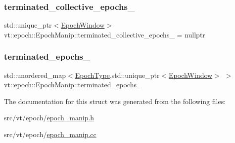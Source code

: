 \subsubsection{\texorpdfstring{terminated\+\_\+collective\+\_\+epochs\+\_\+}{terminated\_collective\_epochs\_}}
{\footnotesize\ttfamily std\+::unique\+\_\+ptr$<$\hyperlink{structvt_1_1epoch_1_1_epoch_window}{Epoch\+Window}$>$ vt\+::epoch\+::\+Epoch\+Manip\+::terminated\+\_\+collective\+\_\+epochs\+\_\+ = nullptr\hspace{0.3cm}{\ttfamily [private]}}

\mbox{\label{structvt_1_1epoch_1_1_epoch_manip_aae06cc3b0a36114406ff318045d1c3fa}} 
\subsubsection{\texorpdfstring{terminated\+\_\+epochs\+\_\+}{terminated\_epochs\_}}
{\footnotesize\ttfamily std\+::unordered\+\_\+map$<$\hyperlink{structvt_1_1epoch_1_1_epoch_type}{Epoch\+Type},std\+::unique\+\_\+ptr$<$\hyperlink{structvt_1_1epoch_1_1_epoch_window}{Epoch\+Window}$>$ $>$ vt\+::epoch\+::\+Epoch\+Manip\+::terminated\+\_\+epochs\+\_\+\hspace{0.3cm}{\ttfamily [private]}}



The documentation for this struct was generated from the following files\+:\begin{DoxyCompactItemize}
\item 
src/vt/epoch/\hyperlink{epoch__manip_8h}{epoch\+\_\+manip.\+h}\item 
src/vt/epoch/\hyperlink{epoch__manip_8cc}{epoch\+\_\+manip.\+cc}\end{DoxyCompactItemize}
